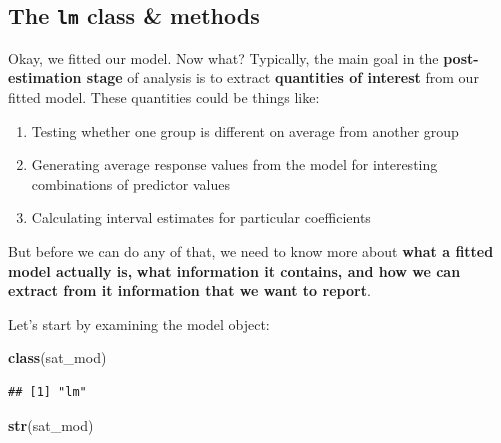 \documentclass[
]{book}
\newenvironment{Shaded}{\begin{snugshade}}{\end{snugshade}}
\newcommand{\KeywordTok}[1]{\textcolor[rgb]{0.13,0.29,0.53}{\textbf{#1}}}
\newcommand{\NormalTok}[1]{#1}
\providecommand{\tightlist}{%
  \setlength{\itemsep}{0pt}\setlength{\parskip}{0pt}}
\begin{document}
\hypertarget{the-lm-class-methods}{%
\subsection{\texorpdfstring{The \texttt{lm} class \& methods}{The lm class \& methods}}\label{the-lm-class-methods}}

Okay, we fitted our model. Now what? Typically, the main goal in the \textbf{post-estimation stage} of analysis
is to extract \textbf{quantities of interest} from our fitted model. These quantities could be things like:

\begin{enumerate}
\def\labelenumi{\arabic{enumi}.}
\tightlist
\item
  Testing whether one group is different on average from another group
\item
  Generating average response values from the model for interesting combinations of predictor values
\item
  Calculating interval estimates for particular coefficients
\end{enumerate}

But before we can do any of that, we need to know more about \textbf{what a fitted model actually is,}
\textbf{what information it contains, and how we can extract from it information that we want to report}.

Let's start by examining the model object:

\begin{Shaded}
\begin{Highlighting}[]
  \KeywordTok{class}\NormalTok{(sat\_mod)}
\end{Highlighting}
\end{Shaded}

\begin{verbatim}
## [1] "lm"
\end{verbatim}

\begin{Shaded}
\begin{Highlighting}[]
  \KeywordTok{str}\NormalTok{(sat\_mod)}
\end{Highlighting}
\end{Shaded}
\end{document}
